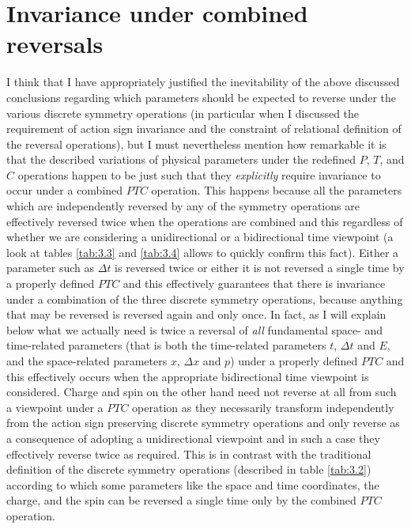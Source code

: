 \documentclass[notitlepage,12pt]{report}
\begin{document}
\section{Invariance under combined reversals}

I think that I have appropriately justified the inevitability of the above discussed conclusions regarding which parameters should be expected to reverse under the various discrete symmetry operations (in particular when I discussed the requirement of action sign invariance and the constraint of relational definition of the reversal operations), but I must nevertheless mention how remarkable it is that the described variations of physical parameters under the redefined $P$, $T$, and $C$ operations happen to be just such that they \textit{explicitly} require invariance to occur under a combined $PTC$ operation. This happens because all the parameters which are independently reversed by any of the symmetry operations are effectively reversed twice when the operations are combined and this regardless of whether we are considering a unidirectional or a bidirectional time viewpoint (a look at tables \ref{tab:3.3} and \ref{tab:3.4} allows to quickly confirm this fact). Either a parameter such as $\Delta t$ is reversed twice or either it is not reversed a single time by a properly defined $PTC$ and this effectively guarantees that there is invariance under a combination of the three discrete symmetry operations, because anything that may be reversed is reversed again and only once. In fact, as I will explain below what we actually need is twice a reversal of \textit{all} fundamental space- and time-related parameters (that is both the time-related parameters $t$, $\Delta t$ and $E$, and the space-related parameters $x$, $\Delta x$ and $p$) under a properly defined $PTC$ and this effectively occurs when the appropriate bidirectional time viewpoint is considered. Charge and spin on the other hand need not reverse at all from such a viewpoint under a $PTC$ operation as they necessarily transform independently from the action sign preserving discrete symmetry operations and only reverse as a consequence of adopting a unidirectional viewpoint and in such a case they effectively reverse twice as required. This is in contrast with the traditional definition of the discrete symmetry operations (described in table \ref{tab:3.2}) according to which some parameters like the space and time coordinates, the charge, and the spin can be reversed a single time only by the combined $PTC$ operation.
\end{document}
